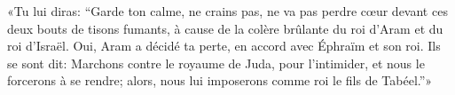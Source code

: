 «Tu lui diras: “Garde ton calme, ne crains pas,
	ne va pas perdre cœur devant ces deux bouts de tisons fumants,
	à cause de la colère brûlante du roi d’Aram et du roi d’Israël.
Oui, Aram a décidé ta perte, en accord avec Éphraïm et son roi.
Ils se sont dit:
	Marchons contre le royaume de Juda, pour l’intimider,
	et nous le forcerons à se rendre;
	alors, nous lui imposerons comme roi le fils de Tabéel.”»
